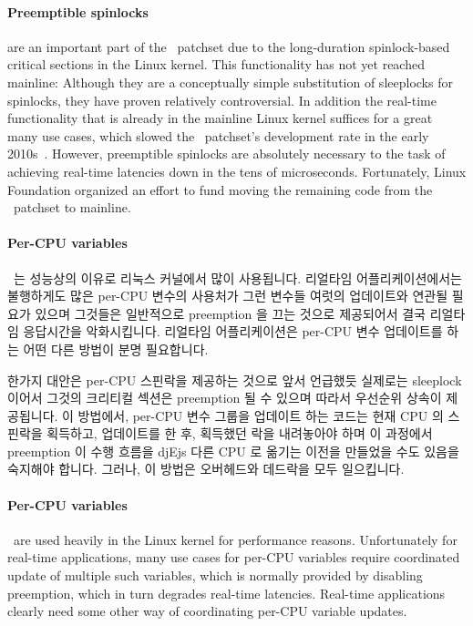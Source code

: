\paragraph{Preemptible spinlocks}
are an important part of the \rt\ patchset due to the long-duration
spinlock-based critical sections in the Linux kernel.
This functionality has not yet reached mainline: Although they are a
conceptually simple substitution of sleeplocks for spinlocks, they have
proven relatively controversial.
In addition the real-time functionality that is already in the mainline
Linux kernel suffices for a great many use cases, which slowed the \rt\
patchset's development rate in the early
2010s~\cite{JakeEdge2013Future-rtLinux,JakeEdge2014Future-rtLinux}.
However, preemptible spinlocks are absolutely necessary to the task of
achieving real-time latencies down in the tens of microseconds.
Fortunately, Linux Foundation organized an effort to fund moving the
remaining code from the \rt\ patchset to mainline.

\fi

\paragraph{Per-CPU variables}\ 는 성능상의 이유로 리눅스 커널에서 많이
사용됩니다.
리얼타임 어플리케이션에서는 불행하게도 많은 per-CPU 변수의 사용처가 그런 변수들
여럿의 업데이트와 연관될 필요가 있으며 그것들은 일반적으로 preemption 을 끄는
것으로 제공되어서 결국 리얼타임 응답시간을 악화시킵니다.
리얼타임 어플리케이션은 per-CPU 변수 업데이트를 하는 어떤 다른 방법이 분명
필요합니다.

한가지 대안은 per-CPU 스핀락을 제공하는 것으로 앞서 언급했듯 실제로는 sleeplock
이어서 그것의 크리티컬 섹션은 preemption 될 수 있으며 따라서 우선순위 상속이
제공됩니다.
이 방법에서, per-CPU 변수 그룹을 업데이트 하는 코드는 현재 CPU 의 스핀락을
획득하고, 업데이트를 한 후, 획득했던 락을 내려놓아야 하며 이 과정에서
preemption 이 수행 흐름을 djEjs 다른 CPU 로 옮기는 이전을 만들었을 수도 있음을
숙지해야 합니다.
그러나, 이 방법은 오버헤드와 데드락을 모두 일으킵니다.

\iffalse

\paragraph{Per-CPU variables}\ are used heavily in the Linux kernel
for performance reasons.
Unfortunately for real-time applications, many use cases for per-CPU
variables require coordinated update of multiple such variables,
which is normally provided by disabling preemption, which in turn
degrades real-time latencies.
Real-time applications clearly need some other way of coordinating
per-CPU variable updates.

